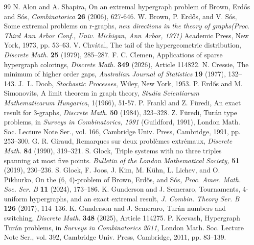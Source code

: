 \documentclass[10pt,a4paper]{amsart}
\numberwithin{equation}{section}
\begin{document}
\begin{thebibliography}{99}
 N. Alon and A. Shapira, On an extremal hypergraph problem of Brown, Erdős and Sós, \emph{Combinatorica} \textbf{26} (2006), 627-646.
 W. Brown, P. Erd\H{o}s, and V. S\'os, Some extremal problems on r-graphs, \emph{new directions in the theory of graphs(Proc. Third Ann Arbor Conf., Univ. Michigan, Ann Arbor, 1971)} Academic Press, New York, 1973, pp. 53–63.
 V. Chv\'atal, The tail of the hypergeometric distribution, \emph{Discrete Math.} \textbf{25} (1979), 285--287.
 F. C. Clemen, Applications of sparse hypergraph colorings, \emph{Discrete Math.} \textbf{349} (2026), Article 114822.
 N. Cressie, The minimum of higher order gaps, \emph{Australian Journal of Statistics} \textbf{19} (1977), 132--143.
 J.~L. Doob, \emph{Stochastic Processes}, Wiley, New York, 1953.
 P. Erd\H{o}s and M. Simonovits, A limit theorem in graph theory, \emph{Studia Scientiarum Mathematicarum Hungarica}, 1(1966), 51-57.
 P. Frankl and Z. F\"uredi, An exact result for 3-graphs, \emph{Discrete Math.} \textbf{50} (1984), 323--328.
 Z. F\"uredi, Tur\'an type problems, in {\em Surveys in Combinatorics, 1991} (Guildford, 1991), London Math. Soc. Lecture Note Ser., vol. 166, Cambridge Univ. Press, Cambridge, 1991, pp. 253--300.
 G. R. Giraud, Remarques sur deux probl\`emes extr\'emaux, \emph{Discrete Math.} \textbf{84} (1990), 319--321.
 S. Glock, Triple systems with no three triples spanning at most five points. \emph{Bulletin of the London Mathematical Society,} \textbf{51} (2019), 230--236.
 S. Glock, F. Joos, J. Kim, M. Kühn, L. Lichev, and O. Pikhurko, On the (6, 4)-problem of Brown, Erd\H{o}s, and S\'os, \emph{Proc. Amer. Math. Soc. Ser. B} \textbf{11} (2024), 173--186.
 K. Gunderson and J. Semeraro, Tournaments, 4-uniform hypergraphs, and an exact extremal result, \emph{J. Combin. Theory Ser. B} \textbf{126} (2017), 114--136.
 K. Gunderson and J. Semeraro, Tur\'an numbers and switching, \emph{Discrete Math.} \textbf{348} (2025), Article 114275.
 P. Keevash, Hypergraph Tur\'an problems, in {\em Surveys in Combinatorics 2011}, London Math. Soc. Lecture Note Ser., vol. 392, Cambridge Univ. Press, Cambridge, 2011, pp. 83--139.

\end{thebibliography}
\end{document}
